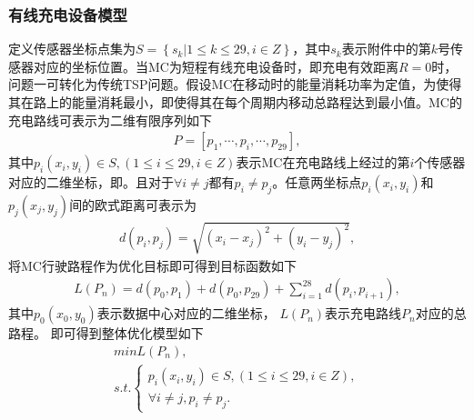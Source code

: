 \documentclass{whutmod}
\begin{document}
\begin{table}[H]
\begin{tablenotes}
			\subsubsection{有线充电设备模型}
		    定义传感器坐标点集为$S=\left \{ s_k| 1\leqslant k \leqslant 29,i\in Z\right \}$，其中$s_k$表示附件中的第$k$号传感器对应的坐标位置。当MC为短程有线充电设备时，即充电有效距离$R=0$时，问题一可转化为传统TSP问题。假设MC在移动时的能量消耗功率为定值，为使得其在路上的能量消耗最小，即使得其在每个周期内移动总路程达到最小值。MC的充电路线可表示为二维有限序列如下
		    \begin{gather}
		    P=[ p_{1},\cdots,p_{i},\cdots,p_{29} ] ,
		    \end{gather}
		     其中$p_{i}(x_i,y_i)\in S,(1\leqslant i \leqslant 29 ,i\in Z)$表示MC在充电路线上经过的第$i$个传感器对应的二维坐标，即。且对于$\forall i \neq j$都有$p_i \neq p_j $。任意两坐标点$p_i(x_i,y_i)$和$p_j(x_j,y_j)$间的欧式距离可表示为
		    \begin{gather*}
		    d(p_i,p_j)=\sqrt{(x_i-x_j)^2+(y_i-y_j)^2},
		    \end{gather*}
		      将MC行驶路程作为优化目标即可得到目标函数如下
		    \begin{gather*}
		    L(P_n)=d(p_0,p_{1})+d(p_0,p_{29})+\sum_{i=1}^{28}d(p_i,p_{i+1}) ,
		    \end{gather*}
		    其中$p_0(x_0,y_0)$表示数据中心对应的二维坐标， $L(P_n)$表示充电路线$P_n$对应的总路程。 即可得到整体优化模型如下 \begin{gather}
		    min L(P_n) ,\\
		    s.t.\left\{\begin{matrix}p_{i}(x_i,y_i)\in S,(1\leqslant i \leqslant 29 ,i\in Z),
		    \\ \forall i \neq j,p_i \neq p_j .
		    \end{matrix}\right.
		    \end{gather}

\end{tablenotes}
\end{table}
\end{document}
